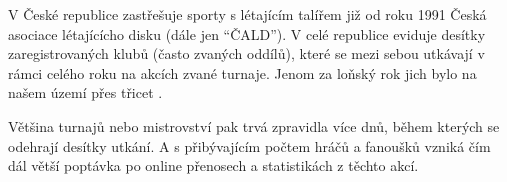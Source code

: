 V České republice zastřešuje sporty s létajícím talířem již od roku 1991\cite{cald-historie} Česká asociace
lé\-ta\-jícícho disku (dále jen ``ČALD''). V celé republice eviduje desítky zaregistrovaných
klubů (často zvaných oddílů), které se mezi sebou utkávají v rámci celého roku na akcích zvané turnaje.
Jenom za loňský rok jich bylo na našem území přes třicet \cite{cald-kalendar}.

\medskip

Většina turnajů nebo mistrovství pak trvá zpravidla více dnů, během kterých se odehrají desítky
utkání. A s přibývajícím počtem hráčů a fanoušků vzniká čím dál větší poptávka po online
přenosech a statistikách z těchto akcí.










